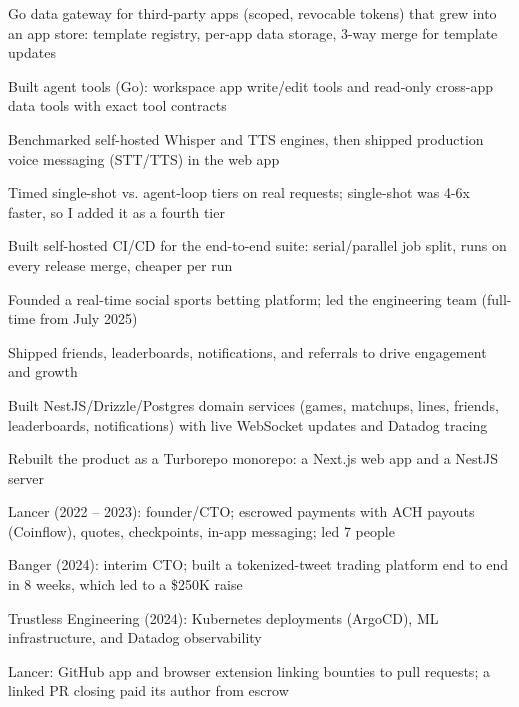 \documentclass[print]{jack-resume}
\begin{document}
\begin{tightemize}
    \item Go data gateway for third-party apps (scoped, revocable tokens) that grew into an app store: template registry, per-app data storage, 3-way merge for template updates
    \item Built agent tools (Go): workspace app write/edit tools and read-only cross-app data tools with exact tool contracts
    \item Benchmarked self-hosted Whisper and TTS engines, then shipped production voice messaging (STT/TTS) in the web app
    \item Timed single-shot vs. agent-loop tiers on real requests; single-shot was 4-6x faster, so I added it as a fourth tier
    \item Built self-hosted CI/CD for the end-to-end suite: serial/parallel job split, runs on every release merge, cheaper per run
\end{tightemize}
\sectionsep

\begin{tightemize}
    \item Founded a real-time social sports betting platform; led the engineering team (full-time from July 2025)
    \item Shipped friends, leaderboards, notifications, and referrals to drive engagement and growth
    \item Built NestJS/Drizzle/Postgres domain services (games, matchups, lines, friends, leaderboards, notifications) with live WebSocket updates and Datadog tracing
    \item Rebuilt the product as a Turborepo monorepo: a Next.js web app and a NestJS server
\end{tightemize}
\sectionsep

\begin{tightemize}
    \item Lancer (2022 -- 2023): founder/CTO; escrowed payments with ACH payouts (Coinflow), quotes, checkpoints, in-app messaging; led 7 people
    \item Banger (2024): interim CTO; built a tokenized-tweet trading platform end to end in 8 weeks, which led to a \$250K raise
    \item Trustless Engineering (2024): Kubernetes deployments (ArgoCD), ML infrastructure, and Datadog observability
    \item Lancer: GitHub app and browser extension linking bounties to pull requests; a linked PR closing paid its author from escrow
\end{tightemize}
\sectionsep
\end{document}
